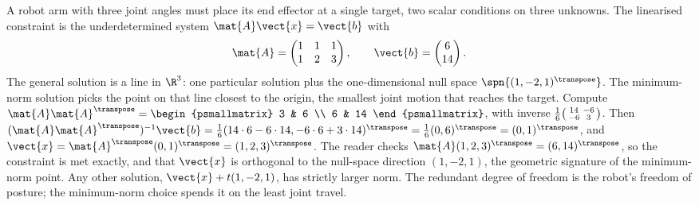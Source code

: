 \begin{example}
A robot arm with three joint angles must place its end effector at a
single target, two scalar conditions on three unknowns. The
linearised constraint is the underdetermined system $\mat{A}\vect{x}
= \vect{b}$ with
\[
\mat{A} = \begin{pmatrix} 1 & 1 & 1 \\ 1 & 2 & 3 \end{pmatrix},
\qquad \vect{b} = \begin{pmatrix} 6 \\ 14 \end{pmatrix}.
\]
The general solution is a line in $\R^{3}$: one particular solution
plus the one-dimensional null space $\spn\{(1, -2, 1)^{\transpose}\}$.
The minimum-norm solution picks the point on that line closest to the
origin, the smallest joint motion that reaches the target. Compute
$\mat{A}\mat{A}^{\transpose} = \begin{psmallmatrix} 3 & 6 \\ 6 & 14
\end{psmallmatrix}$, with inverse $\tfrac{1}{6}\begin{psmallmatrix}
14 & -6 \\ -6 & 3 \end{psmallmatrix}$. Then $(\mat{A}\mat{A}^{
\transpose})^{-1}\vect{b} = \tfrac{1}{6}(14 \cdot 6 - 6 \cdot 14,
-6 \cdot 6 + 3 \cdot 14)^{\transpose} = \tfrac{1}{6}(0, 6)^{\transpose}
= (0, 1)^{\transpose}$, and $\vect{x} = \mat{A}^{\transpose}(0,
1)^{\transpose} = (1, 2, 3)^{\transpose}$. The reader checks
$\mat{A}(1,2,3)^{\transpose} = (6, 14)^{\transpose}$, so the
constraint is met exactly, and that $\vect{x}$ is orthogonal to the
null-space direction $(1, -2, 1)$, the geometric signature of the
minimum-norm point. Any other solution, $\vect{x} + t(1, -2, 1)$,
has strictly larger norm. The redundant degree of freedom is the
robot's freedom of posture; the minimum-norm choice spends it on the
least joint travel.
\end{example}


